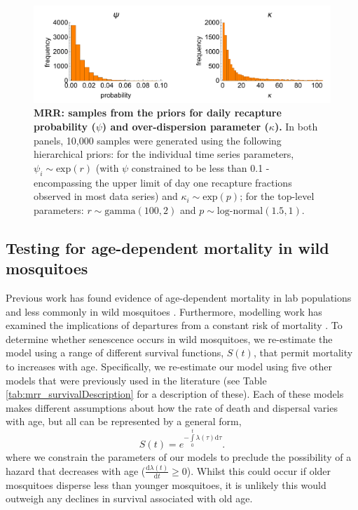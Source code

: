 \documentclass[12pt]{article}
\begin{document}
\begin{figure}[h]
	\centerline{\includegraphics[width=1\textwidth]{./Figure_files/mrr_priors_PsiKappa.pdf}}
	\caption{\textbf{MRR: samples from the priors for daily recapture probability ($\psi$) and over-dispersion parameter ($\kappa$).} In both panels, 10,000 samples were generated using the following hierarchical priors: for the individual time series parameters, $\psi_i \sim \text{exp}(r)$ (with $\psi$ constrained to be less than 0.1 - encompassing the upper limit of day one recapture fractions observed in most data series) and $\kappa_i \sim \text{exp}(p)$; for the top-level parameters: $r\sim \text{gamma}(100, 2)$ and $p\sim \text{log-normal}(1.5, 1)$.}\label{fig:mrr_PsiKappaPriors}
\end{figure}

\subsection{Testing for age-dependent mortality in wild mosquitoes}\label{sec:mrr_age_dependence}
Previous work has found evidence of age-dependent mortality in lab populations \citep{styer2007mosquitoes,dawes2009anopheles} and less commonly in wild mosquitoes \citep{clements1981analysis,harrington2008age}. Furthermore, modelling work has examined the implications of departures from a constant risk of mortality \citep{styer2007mosquitoes,hancock2009age,novoseltsev2012age}. To determine whether senescence occurs in wild mosquitoes, we re-estimate the model using a range of different survival functions, $S(t)$, that permit mortality to increases with age. Specifically, we re-estimate our model using five other models that were previously used in the literature (see Table \ref{tab:mrr_survivalDescription} for a description of these). Each of these models makes different assumptions about how the rate of death and dispersal varies with age, but all can be represented by a general form,
%
\begin{equation}\label{eq:survivalInt}
S(t) = e^{-\int\limits_{0}^{t}\lambda(\tau) \mathrm{d}\tau}.
\end{equation}
%
where we constrain the parameters of our models to preclude the possibility of a hazard that decreases with age ($\frac{\mathrm{d}\lambda(t)}{\mathrm{d}t} \geq 0$). Whilst this could occur if older mosquitoes disperse less than younger mosquitoes, it is unlikely this would outweigh any declines in survival associated with old age.
\end{document}

